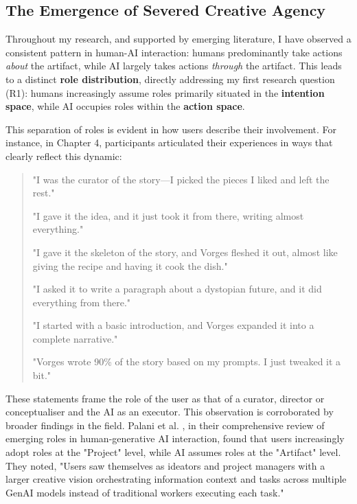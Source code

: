 \subsection{The Emergence of Severed Creative Agency}

Throughout my research, and supported by emerging literature, I have observed a consistent pattern in human-AI interaction: humans predominantly take actions \textit{about} the artifact, while AI largely takes actions \textit{through} the artifact. This leads to a distinct \textbf{role distribution}, directly addressing my first research question (R1): humans increasingly assume roles primarily situated in the \textbf{intention space}, while AI occupies roles within the \textbf{action space}.

This separation of roles is evident in how users describe their involvement. For instance, in Chapter 4, participants articulated their experiences in ways that clearly reflect this dynamic:

\begin{quote}
"I was the curator of the story—I picked the pieces I liked and left the rest."

"I gave it the idea, and it just took it from there, writing almost everything."

"I gave it the skeleton of the story, and Vorges fleshed it out, almost like giving the recipe and having it cook the dish."

"I asked it to write a paragraph about a dystopian future, and it did everything from there."

"I started with a basic introduction, and Vorges expanded it into a complete narrative."

"Vorges wrote 90\% of the story based on my prompts. I just tweaked it a bit."
\end{quote}

These statements frame the role of the user as that of a curator, director or conceptualiser and the AI as an executor. This observation is corroborated by broader findings in the field. Palani et al. \cite{Palani2024-on}, in their comprehensive review of emerging roles in human-generative AI interaction, found that users increasingly adopt roles at the "Project" level, while AI assumes roles at the "Artifact" level. They noted, "Users saw themselves as ideators and project managers with a larger creative vision orchestrating information context and tasks across multiple GenAI models instead of traditional workers executing each task."

